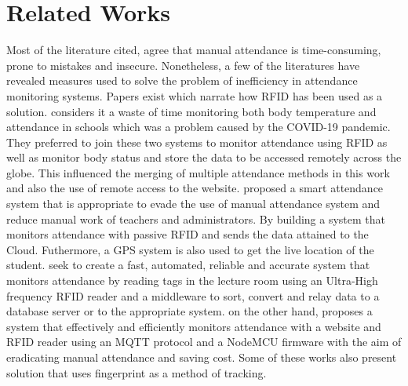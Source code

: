 \section{Related Works}
Most of the literature cited, agree that manual attendance is time-consuming, prone to mistakes and insecure. Nonetheless, a few of the literatures have revealed measures used to solve the problem of inefficiency in attendance monitoring systems. Papers exist which narrate how \gls{RFID} has been used as a solution. \citeauthor{KaziARP} considers it a waste of time monitoring both body temperature and attendance in schools which was a problem caused by the COVID-19 pandemic. They preferred to join these two systems to monitor attendance using \gls{RFID} as well as monitor body status and store the data to be accessed remotely across the globe.\cite{KaziARP} This influenced the merging of multiple attendance methods in this work and also the use of remote access to the website. \citeauthor{Tt2021} proposed a smart attendance system that is appropriate to evade the use of manual attendance system and reduce manual work of teachers and administrators. By building a system that monitors attendance with passive \gls{RFID} and sends the data attained to the Cloud. Futhermore, a GPS system is also used to get the live location of the student.\cite{Tt2021} \citeauthor{Www2012} seek to create a fast, automated, reliable and accurate system that monitors attendance by reading tags in the lecture room using an Ultra-High frequency \gls{RFID} reader and a middleware to sort, convert and relay data to a database server or to the appropriate system.\cite{Www2012} \citeauthor{Bhagat2020} on the other hand, proposes a system that effectively and efficiently monitors attendance with a website and \gls{RFID} reader using an MQTT protocol and a NodeMCU firmware with the aim of eradicating manual attendance and saving cost.\cite{Bhagat2020}
Some of these works also present solution that uses fingerprint as a method of tracking.
